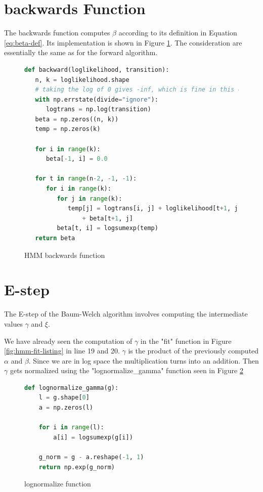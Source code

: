 \section{backwards Function}

The backwards function computes $\beta$ according to its definition in Equation \ref{eq:beta-def}. Its implementation is shown in Figure \ref{fig:hmm-backwards-listing}. The consideration are essentially the same as for the forward algorithm. 

\begin{figure}
\begin{singlespace}
\begin{lstlisting}[language=Python]
def backward(loglikelihood, transition):
   n, k = loglikelihood.shape
   # taking the log of 0 gives -inf, which is fine in this case
   with np.errstate(divide="ignore"):
      logtrans = np.log(transition)
   beta = np.zeros((n, k))
   temp = np.zeros(k)

   for i in range(k):
      beta[-1, i] = 0.0

   for t in range(n-2, -1, -1):
      for i in range(k):
         for j in range(k):
            temp[j] = logtrans[i, j] + loglikelihood[t+1, j] \
                + beta[t+1, j]
         beta[t, i] = logsumexp(temp)
   return beta
\end{lstlisting}
\end{singlespace}
\caption{HMM backwards function}    
\label{fig:hmm-backwards-listing}
\end{figure}

\section{E-step}

The E-step of the Baum-Welch algorithm involves computing the intermediate values $\gamma$ and $\xi$. 

We have already seen the computation of $\gamma$ in the "fit" function in Figure \ref{fig:hmm-fit-listing} in line 19 and 20. $\gamma$ is the product of the previously computed $\alpha$ and $\beta$. Since we are in log space the multiplication turns into an addition. Then $\gamma$ gets normalized using the "lognormalize\_gamma" function seen in Figure \ref{fig:lognormalize-listing}

\begin{figure}
\begin{singlespace}
\begin{lstlisting}[language=Python]
   def lognormalize_gamma(g):
    l = g.shape[0]
    a = np.zeros(l)

    for i in range(l):
        a[i] = logsumexp(g[i])

    g_norm = g - a.reshape(-1, 1)
    return np.exp(g_norm)
\end{lstlisting}
\end{singlespace}
\caption{lognormalize function}    
\label{fig:lognormalize-listing}
\end{figure}

